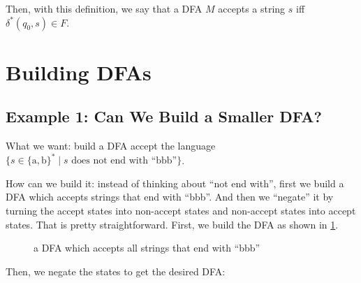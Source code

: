 \documentclass[11pt]{article}
\begin{document}
Then, with this definition, we say that a DFA $M$ accepts a string $s$ iff $\delta ^ \ast(q_0, s) \in F$.

\section{Building DFAs} \label{sec:3}

\subsection{Example 1: Can We Build a Smaller DFA?} \label{subsec:3.1}

What we want: build a DFA accept the language $\{s \in \{\mathrm{a},\mathrm{b}\} ^\ast \mid s
\text{ does not end with ``bbb''} \}$.

How can we build it: instead of thinking about ``not end with'', first we build a DFA which accepts strings that end with ``bbb''. And then we ``negate'' it by turning the
accept states into non-accept states and non-accept states into accept states.
That is pretty straightforward. First, we build the DFA as shown in \ref{fig:fig2}.

\begin{figure}[ht]
    \centering
    \caption{a DFA which accepts all strings that end with ``bbb''}
    \label{fig:fig2}
\end{figure}

Then, we negate the states to get the desired DFA:
\end{document}
